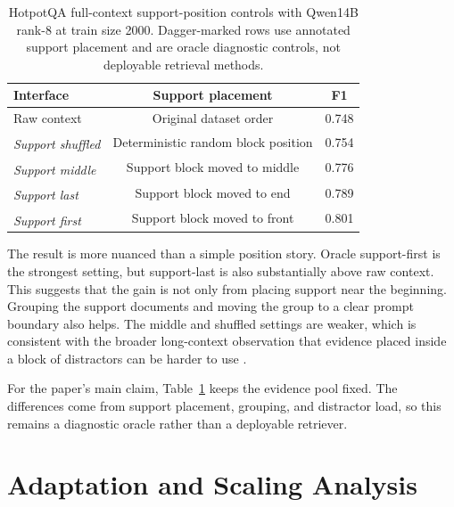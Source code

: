 \documentclass[a4paper,fleqn]{cas-sc}
\newcommand{\diagiface}[1]{\emph{#1}\textsuperscript{\dag}}
\begin{document}
\begin{table}[t]
\centering
\caption{HotpotQA full-context support-position controls with Qwen14B rank-8
at train size 2000. Dagger-marked rows use annotated support placement and are
oracle diagnostic controls, not deployable retrieval methods.}
\label{tab:hotpotqa-position}
\small
\begin{tabular}{lcc}
\toprule
Interface & Support placement & F1 \\
\midrule
Raw context & Original dataset order & 0.748 \\
\diagiface{Support shuffled} & Deterministic random block position & 0.754 \\
\diagiface{Support middle} & Support block moved to middle & 0.776 \\
\diagiface{Support last} & Support block moved to end & 0.789 \\
\diagiface{Support first} & Support block moved to front & 0.801 \\
\bottomrule
\end{tabular}
\end{table}

The result is more nuanced than a simple position story. Oracle support-first
is the strongest setting, but support-last is also substantially above raw
context. This suggests that the gain is not only from placing support near the
beginning. Grouping the support documents and moving the group to a clear
prompt boundary also helps. The middle and shuffled settings are weaker, which
is consistent with the broader long-context observation that evidence placed
inside a block of distractors can be harder to use \citep{liu2023lost}.

For the paper's main claim, Table~\ref{tab:hotpotqa-position} keeps the
evidence pool fixed. The differences come from support placement, grouping, and
distractor load, so this remains a diagnostic oracle rather than a deployable
retriever.

\section{Adaptation and Scaling Analysis}
\end{document}
